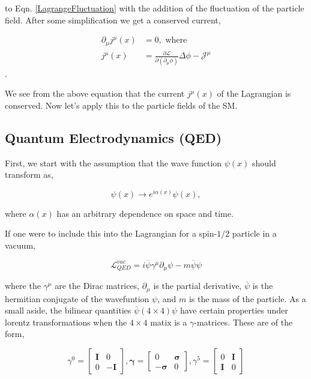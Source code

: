 to Eqn. \ref{LagrangeFluctuation} with the addition of the fluctuation of the particle field. After some simplification we get a conserved current,
 
 \begin{equation}
 \begin{split}
 \partial_\mu j^\mu(x)&=0, \text{ where}\\
 j^\mu(x)&=\frac{\partial\mathcal{L}}{\partial(\partial_\mu\phi)}\Delta\phi-\mathcal{J}^\mu
 \end{split}
 \end{equation}.
 
 We see from the above equation that the current $j^\mu(x)$ of the Lagrangian is conserved. Now let's apply this to the particle fields of the SM.
 
 \subsection{Quantum Electrodynamics (QED)}
 
 First, we start with the assumption that the wave function $\psi(x)$ should transform as,
 
 \begin{equation}\label{U1gauge}
 \psi(x)\rightarrow e^{i\alpha(x)}\psi(x),
 \end{equation}
 
 where $\alpha(x)$ has an arbitrary dependence on space and time. 
 
If one were to include this into the Lagrangian for a spin-$1/2$ particle in a vacuum,
 
\begin{equation}\label{DiracLag}
\mathcal{L}_{QED}^{vac}=i\overline{\psi}\gamma^\mu\partial_\mu\psi-m\overline{\psi}\psi
\end{equation}
 
where the $\gamma^\mu$ are the Dirac matrices, $\partial_\mu$ is the partial derivative, $\overline{\psi}$ is the hermitian conjugate of the wavefuntion $\psi$, and $m$ is the mass of the particle. As a small aside, the bilinear quantities $\overline{\psi}(4\times4)\psi$ have certain properties under lorentz transformations when the $4\times4$ matix is a $\gamma$-matrices. These are of the form,

\begin{equation} \label{gammaMatrix}
\gamma^0=
\begin{bmatrix}
\boldsymbol{I} & 0 \\
0 & -\boldsymbol{I}
\end{bmatrix},
\boldsymbol{\gamma}=
\begin{bmatrix}
0 & \boldsymbol{\sigma} \\
-\boldsymbol{\sigma} & 0
\end{bmatrix},
\gamma^5=
\begin{bmatrix}
0 & \boldsymbol{I} \\
\boldsymbol{I} & 0
\end{bmatrix}
\end{equation}

